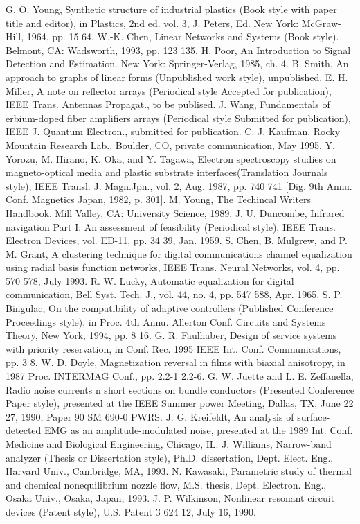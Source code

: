 \documentclass[letterpaper, 10 pt, conference]{ieeeconf}  %
\begin{document}
\begin{thebibliography}{99}

 G. O. Young, Synthetic structure of industrial plastics (Book style with paper title and editor), 	in Plastics, 2nd ed. vol. 3, J. Peters, Ed.  New York: McGraw-Hill, 1964, pp. 15  64.
 W.-K. Chen, Linear Networks and Systems (Book style).	Belmont, CA: Wadsworth, 1993, pp. 123  135.
 H. Poor, An Introduction to Signal Detection and Estimation.   New York: Springer-Verlag, 1985, ch. 4.
 B. Smith, An approach to graphs of linear forms (Unpublished work style), unpublished.
 E. H. Miller, A note on reflector arrays (Periodical style Accepted for publication), IEEE Trans. Antennas Propagat., to be publised.
 J. Wang, Fundamentals of erbium-doped fiber amplifiers arrays (Periodical style Submitted for publication), IEEE J. Quantum Electron., submitted for publication.
 C. J. Kaufman, Rocky Mountain Research Lab., Boulder, CO, private communication, May 1995.
 Y. Yorozu, M. Hirano, K. Oka, and Y. Tagawa, Electron spectroscopy studies on magneto-optical media and plastic substrate interfaces(Translation Journals style), IEEE Transl. J. Magn.Jpn., vol. 2, Aug. 1987, pp. 740  741 [Dig. 9th Annu. Conf. Magnetics Japan, 1982, p. 301].
 M. Young, The Techincal Writers Handbook.  Mill Valley, CA: University Science, 1989.
 J. U. Duncombe, Infrared navigation Part I: An assessment of feasibility (Periodical style), IEEE Trans. Electron Devices, vol. ED-11, pp. 34  39, Jan. 1959.
 S. Chen, B. Mulgrew, and P. M. Grant, A clustering technique for digital communications channel equalization using radial basis function networks, IEEE Trans. Neural Networks, vol. 4, pp. 570  578, July 1993.
 R. W. Lucky, Automatic equalization for digital communication, Bell Syst. Tech. J., vol. 44, no. 4, pp. 547  588, Apr. 1965.
 S. P. Bingulac, On the compatibility of adaptive controllers (Published Conference Proceedings style), in Proc. 4th Annu. Allerton Conf. Circuits and Systems Theory, New York, 1994, pp. 8  16.
 G. R. Faulhaber, Design of service systems with priority reservation, in Conf. Rec. 1995 IEEE Int. Conf. Communications, pp. 3  8.
 W. D. Doyle, Magnetization reversal in films with biaxial anisotropy, in 1987 Proc. INTERMAG Conf., pp. 2.2-1  2.2-6.
 G. W. Juette and L. E. Zeffanella, Radio noise currents n short sections on bundle conductors (Presented Conference Paper style), presented at the IEEE Summer power Meeting, Dallas, TX, June 22  27, 1990, Paper 90 SM 690-0 PWRS.
 J. G. Kreifeldt, An analysis of surface-detected EMG as an amplitude-modulated noise, presented at the 1989 Int. Conf. Medicine and Biological Engineering, Chicago, IL.
 J. Williams, Narrow-band analyzer (Thesis or Dissertation style), Ph.D. dissertation, Dept. Elect. Eng., Harvard Univ., Cambridge, MA, 1993. 
 N. Kawasaki, Parametric study of thermal and chemical nonequilibrium nozzle flow, M.S. thesis, Dept. Electron. Eng., Osaka Univ., Osaka, Japan, 1993.
 J. P. Wilkinson, Nonlinear resonant circuit devices (Patent style), U.S. Patent 3 624 12, July 16, 1990. 


\end{thebibliography}
\end{document}
